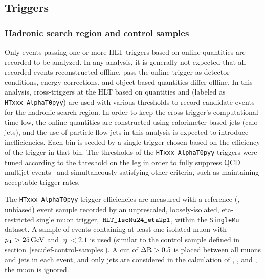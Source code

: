 \subsection{Triggers}

\subsubsection{Hadronic search region and control samples\label{sec:signal_triggers}} 

Only events passing one or more HLT triggers based on online quantities 
are recorded to be analyzed. In any analysis, it is generally not expected 
that all recorded events reconstructed offline, pass the online 
trigger as detector conditions, energy corrections, and object-based quantities
differ offline. In this analysis, cross-triggers at the HLT
based on quantities \scalht and \alphat (labeled as \verb!HTxxx_AlphaT0pyy!) 
are used with various thresholds to record candidate events for the hadronic search
region. In order to keep the cross-trigger's computational time low, the online quantities
are constructed using calorimeter based jets (calo jets), and the use of
particle-flow jets in this analysis is expected to introduce inefficiencies.
Each \scalht bin is seeded by a single trigger chosen based on the
efficiency of the trigger in that \scalht bin. The \alphat thresholds of the
\verb!HTxxx_AlphaT0pyy! triggers were tuned according to the threshold
on the \scalht leg in order to fully suppress QCD multijet events~\cite{RA1Paper2012}
and simultaneously satisfying other criteria, such as maintaining
acceptable trigger rates.

The \verb!HTxxx_AlphaT0pyy! trigger efficiencies are measured with a
reference (\ie, unbiased) event sample recorded by an unprescaled,
loosely-isolated, eta-restricted single muon trigger,$\,$      $\verb!HLT_IsoMu24_eta2p1!$,
within the \verb!SingleMu! dataset. A sample of events containing at 
least one isolated muon with $p_{\mathrm{T}} > 25\,\text{Ge\hspace{-.08em}V}$ and $|\eta| < 2.1$ is used 
(similar to the \mj control sample defined in 
section~\ref{sec:def-control-samples}). A cut of $\Delta
{\rm R} > 0.5$ is placed between all muons and jets in each event, and
only jets are considered in the calculation of \scalht, \mht, and
\alphat, \ie the muon is ignored.

